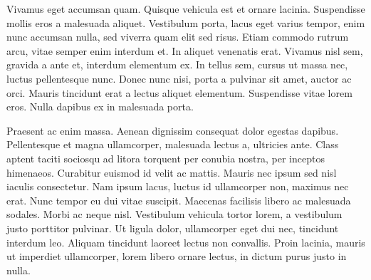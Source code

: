 Vivamus eget accumsan quam. Quisque vehicula est et ornare lacinia. Suspendisse mollis eros a malesuada aliquet. Vestibulum porta, lacus eget varius tempor, enim nunc accumsan nulla, sed viverra quam elit sed risus. Etiam commodo rutrum arcu, vitae semper enim interdum et. In aliquet venenatis erat. Vivamus nisl sem, gravida a ante et, interdum elementum ex. In tellus sem, cursus ut massa nec, luctus pellentesque nunc. Donec nunc nisi, porta a pulvinar sit amet, auctor ac orci. Mauris tincidunt erat a lectus aliquet elementum. Suspendisse vitae lorem eros. Nulla dapibus ex in malesuada porta.

Praesent ac enim massa. Aenean dignissim consequat dolor egestas dapibus. Pellentesque et magna ullamcorper, malesuada lectus a, ultricies ante. Class aptent taciti sociosqu ad litora torquent per conubia nostra, per inceptos himenaeos. Curabitur euismod id velit ac mattis. Mauris nec ipsum sed nisl iaculis consectetur. Nam ipsum lacus, luctus id ullamcorper non, maximus nec erat. Nunc tempor eu dui vitae suscipit. Maecenas facilisis libero ac malesuada sodales. Morbi ac neque nisl. Vestibulum vehicula tortor lorem, a vestibulum justo porttitor pulvinar. Ut ligula dolor, ullamcorper eget dui nec, tincidunt interdum leo. Aliquam tincidunt laoreet lectus non convallis. Proin lacinia, mauris ut imperdiet ullamcorper, lorem libero ornare lectus, in dictum purus justo in nulla.